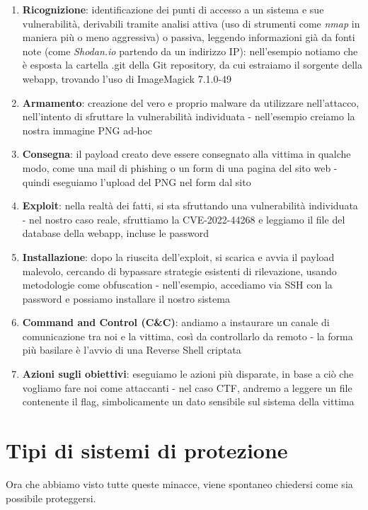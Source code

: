 \begin{enumerate}
    \item \textbf{Ricognizione}: identificazione dei punti di accesso a un sistema e sue vulnerabilità, derivabili tramite analisi attiva (uso di strumenti come \emph{nmap} in maniera più o meno aggressiva) o passiva, leggendo informazioni già da fonti note (come \emph{Shodan.io} partendo da un indirizzo IP): nell'esempio notiamo che è esposta la cartella .git della Git repository, da cui estraiamo il sorgente della webapp, trovando l'uso di ImageMagick 7.1.0-49
    
    \item \textbf{Armamento}: creazione del vero e proprio malware da utilizzare nell'attacco, nell'intento di sfruttare la vulnerabilità individuata - nell'esempio creiamo la nostra immagine PNG ad-hoc

    \item \textbf{Consegna}: il payload creato deve essere consegnato alla vittima in qualche modo, come una mail di phishing o un form di una pagina del sito web - quindi eseguiamo l'upload del PNG nel form dal sito

    \item \textbf{Exploit}: nella realtà dei fatti, si sta sfruttando una vulnerabilità individuata - nel nostro caso reale, sfruttiamo la CVE-2022-44268 e leggiamo il file del database della webapp, incluse le password

    \item \textbf{Installazione}: dopo la riuscita dell'exploit, si scarica e avvia il payload malevolo, cercando di bypassare strategie esistenti di rilevazione, usando metodologie come obfuscation - nell'esempio, accediamo via SSH con la password e possiamo installare il nostro sistema

    \item \textbf{Command and Control (C\&C)}: andiamo a instaurare un canale di comunicazione tra noi e la vittima, così da controllarlo da remoto - la forma più basilare è l'avvio di una Reverse Shell criptata

    \item \textbf{Azioni sugli obiettivi}: eseguiamo le azioni più disparate, in base a ciò che vogliamo fare noi come attaccanti - nel caso CTF, andremo a leggere un file contenente il flag, simbolicamente un dato sensibile sul sistema della vittima
\end{enumerate}

\section{Tipi di sistemi di protezione}
Ora che abbiamo visto tutte queste minacce, viene spontaneo chiedersi come sia possibile proteggersi.

